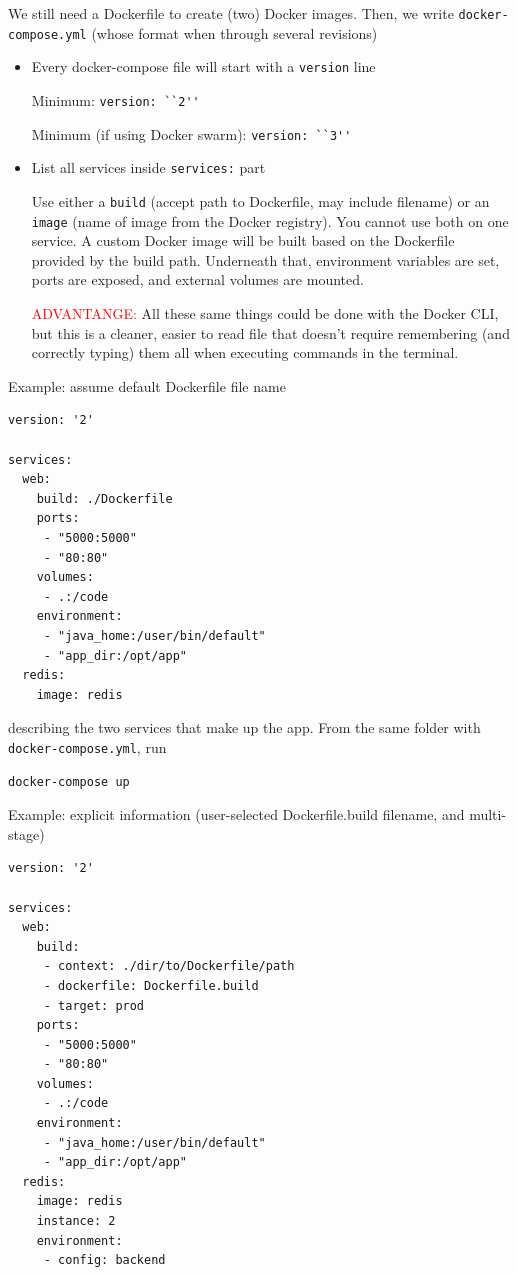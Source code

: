 We still need a Dockerfile to create (two) Docker images. Then, we write \verb!docker-compose.yml! 
(whose format when through several revisions)
\begin{itemize}
  \item  Every docker-compose file will start with a \verb!version! line
 
  
  Minimum: \verb!version: ``2''!
  
  Minimum (if using Docker swarm): \verb!version: ``3''!
  
  \item List all services inside \verb!services:! part
  
  Use either a \verb!build! (accept path to Dockerfile, may include filename) or
  an \verb!image! (name of image from the Docker registry). You cannot use both
  on one service.
  A custom Docker image will be built based on the Dockerfile provided by the
  build path. Underneath that, environment variables are set, ports are exposed,
  and external volumes are mounted.
  
  \textcolor{red}{ADVANTANGE:} All these same things could be done with the
  Docker CLI, but this is a cleaner, easier to read file that doesn’t require
  remembering (and correctly typing) them all when executing commands in the terminal.
  
\end{itemize}

Example: assume default Dockerfile file name
\begin{verbatim}
version: '2'

services:
  web:
    build: ./Dockerfile
    ports:
     - "5000:5000"
     - "80:80"
    volumes:
     - .:/code
    environment:
     - "java_home:/user/bin/default"
     - "app_dir:/opt/app"
  redis:
    image: redis
\end{verbatim}
describing the two services that make up the app.
From the same folder with \verb!docker-compose.yml!, run
\begin{verbatim}
docker-compose up 
\end{verbatim}

Example: explicit information (user-selected Dockerfile.build filename, and multi-stage)
\begin{verbatim}
version: '2'

services:
  web:
    build: 
     - context: ./dir/to/Dockerfile/path
     - dockerfile: Dockerfile.build
     - target: prod
    ports:
     - "5000:5000"
     - "80:80"
    volumes:
     - .:/code
    environment:
     - "java_home:/user/bin/default"
     - "app_dir:/opt/app"
  redis:
    image: redis
    instance: 2
    environment:
     - config: backend
\end{verbatim}

